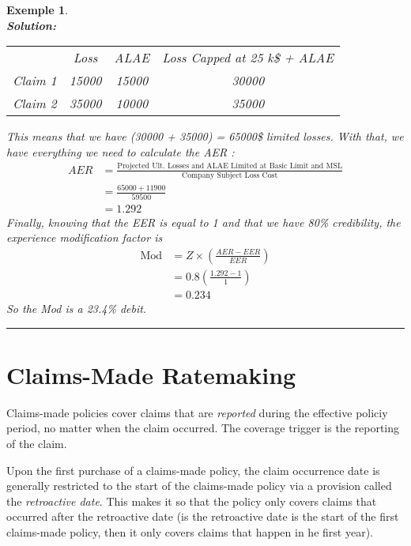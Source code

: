 \documentclass[11pt, english]{memoir}
\numberwithin{definition}{section}
\newtheorem{example}{Exemple}[section]
\newenvironment{exemple}
{
	\begin{example} \normalfont \ \\[5pt] 
	}
	{
		\hfill\rule{0.5em}{0.5em}\end{example}
}
\newenvironment{solution}
{\noindent\textbf{Solution:} \\[5pt] 
}{
}
\begin{document}
\begin{exemple}
\begin{solution}
	\begin{tabular}{cccc}
		& Loss & ALAE& Loss Capped at 25 k\$ + ALAE\\
		Claim 1 &15000 & 15000 & 30000\\
		Claim 2 &35000 & 10000 & 35000\\
	\end{tabular}

	This means that we have (30000 + 35000) = 65000\$ limited losses. With that, we have everything we need to calculate the \emph{AER} :
	\begin{align*}
	AER &= \frac{\text{Projected Ult. Losses and ALAE Limited at Basic Limit and MSL}}{\text{Company Subject Loss Cost}}\\
	&= \frac{65000 + 11900}{59500}\\
	&= 1.292
	\end{align*}
	Finally, knowing that the \emph{EER} is equal to 1 and that we have 80\% credibility, the experience modification factor is 
	\begin{align*}
	\text{Mod} &= Z \times \left(\frac{AER - EER}{EER}\right)\\
	&= 0.8 \left(\frac{1.292 - 1}{1} \right) \\
	&= 0.234
	\end{align*}
	So the Mod is a 23.4\% debit. 
\end{solution}
\end{exemple}













\chapter{Claims-Made Ratemaking}

Claims-made policies cover claims that are \emph{reported} during the effective policiy period, no matter when the claim occurred. The coverage trigger is the reporting of the claim. 

Upon the first purchase of a claims-made policy, the claim occurrence date is generally restricted to the start of the claims-made policy via a provision called the \emph{retroactive date}. This makes it so that the policy only covers claims that occurred after the retroactive date (is the retroactive date is the start of the first claims-made policy, then it only covers claims that happen in he first year).
\end{document}
